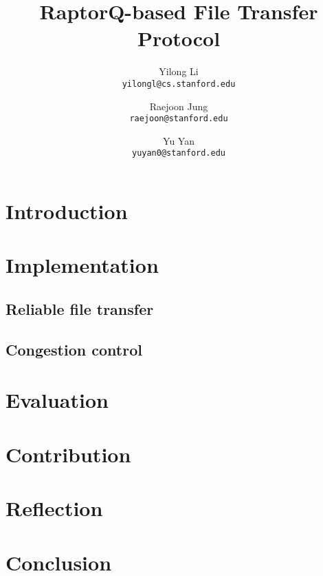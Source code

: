 \documentclass{sig-alternate-10pt}
\begin{document}
\title{RaptorQ-based File Transfer Protocol}
\author{
  Yilong Li\\
  \texttt{yilongl@cs.stanford.edu}
  \and 
  Raejoon Jung\\
  \texttt{raejoon@stanford.edu}
  \and
  Yu Yan\\
  \texttt{yuyan0@stanford.edu}
}

\maketitle
\section{Introduction}

\section{Implementation}

\subsection{Reliable file transfer}

\subsection{Congestion control}

\section{Evaluation}

\section{Contribution}

\section{Reflection}

\section{Conclusion}




\end{document}
